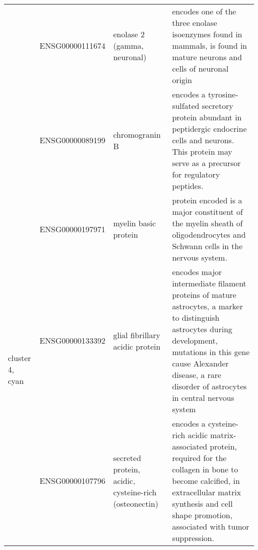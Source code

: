 \begin{table}
\begin{center}
\begin{tabular}{|p{0.5in}|c|p{1in}|p{3.5in}|}
 					    & ENSG00000111674 & enolase 2 (gamma, neuronal) & encodes one of the three enolase isoenzymes found in mammals, is found in mature neurons and cells of neuronal origin \\
					    &  ENSG00000089199 &  chromogranin B & encodes a tyrosine-sulfated secretory protein abundant in peptidergic endocrine cells and neurons. This protein may serve as a precursor for regulatory peptides. \\
 \hline
 \multirow{3}{4em}{cluster 4, cyan} & ENSG00000197971 & myelin basic protein & protein encoded is a major constituent of the myelin sheath of oligodendrocytes and Schwann cells in the nervous system. \\
 					    & ENSG00000133392 & glial fibrillary acidic protein & encodes major intermediate filament proteins of mature astrocytes, a marker to distinguish astrocytes during development, mutations in this gene cause Alexander disease, a rare disorder of astrocytes in central nervous system\\
					    & ENSG00000107796  & secreted protein, acidic, cysteine-rich (osteonectin)  & encodes a cysteine-rich acidic matrix-associated protein, required for the collagen in bone to become calcified, in extracellular matrix synthesis and cell shape promotion, associated with tumor suppression. \\
\hline
\end{tabular}
 \end{center} \label{tab:tab2}
\end{table}



